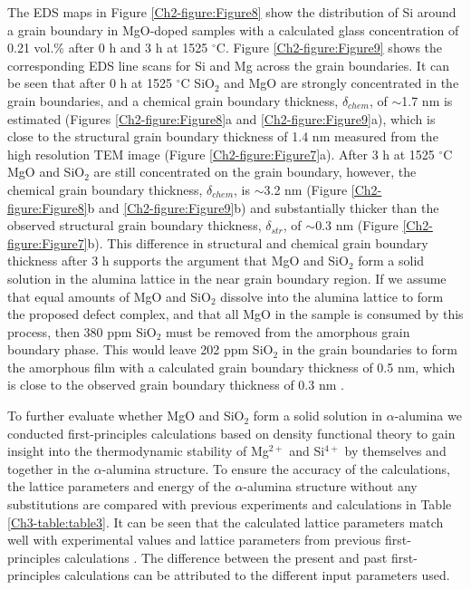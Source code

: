 The EDS maps in Figure \ref{Ch2-figure:Figure8} show the distribution of Si around a grain boundary in MgO-doped samples with a calculated glass concentration of 0.21 vol.\% after 0 h and 3 h at 1525 $^{\circ}$C. Figure \ref{Ch2-figure:Figure9} shows the corresponding EDS line scans for Si and Mg across the grain boundaries. It can be seen that after 0 h at 1525 $^{\circ}$C SiO$_{2}$ and MgO are strongly concentrated in the grain boundaries, and a chemical grain boundary thickness, $\delta_{chem}$, of $\sim$1.7 nm is estimated (Figures \ref{Ch2-figure:Figure8}a and \ref{Ch2-figure:Figure9}a), which is close to the structural grain boundary thickness of 1.4 nm measured from the high resolution TEM image (Figure \ref{Ch2-figure:Figure7}a). After 3 h at 1525 $^{\circ}$C MgO and SiO$_{2}$ are still concentrated on the grain boundary, however, the chemical grain boundary thickness, $\delta_{chem}$, is $\sim$3.2 nm (Figure \ref{Ch2-figure:Figure8}b and \ref{Ch2-figure:Figure9}b) and substantially thicker than the observed structural grain boundary thickness, $\delta_{str}$, of $\sim$0.3 nm (Figure \ref{Ch2-figure:Figure7}b). This difference in structural and chemical grain boundary thickness after 3 h supports the argument that MgO and SiO$_{2}$ form a solid solution in the alumina lattice in the near grain boundary region. If we assume that equal amounts of MgO and SiO$_{2}$ dissolve into the alumina lattice to form the proposed defect complex, and that all MgO in the sample is consumed by this process, then 380 ppm SiO$_{2}$ must be removed from the amorphous grain boundary phase. This would leave 202 ppm SiO$_{2}$ in the grain boundaries to form the amorphous film with a calculated grain boundary thickness of 0.5 nm, which is close to the observed grain boundary thickness of 0.3 nm \cite{Frueh2016}.

To further evaluate whether MgO and SiO$_{2}$ form a solid solution in $\alpha$-alumina we conducted first-principles calculations based on density functional theory to gain insight into the thermodynamic stability of Mg$^{2+}$ and Si$^{4+}$ by themselves and together in the $\alpha$-alumina structure. To ensure the accuracy of the calculations, the lattice parameters and energy of the $\alpha$-alumina structure without any substitutions are compared with previous experiments and calculations in Table \ref{Ch3-table:table3}. It can be seen that the calculated lattice parameters match well with experimental values and lattice parameters from previous first-principles calculations \cite{Jain2013,MaterialsProject,Graham1960_595,Bergerhoff1983,Karlsruhe,Atkinson2003}. The difference between the present and past first-principles calculations can be attributed to the different input parameters used. 

